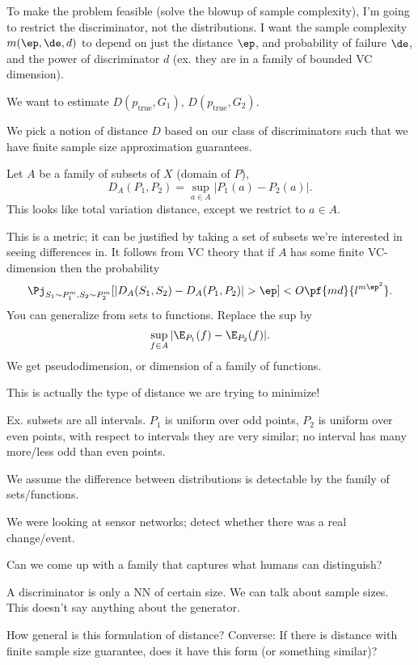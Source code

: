%
To make the problem feasible (solve the blowup of sample complexity), I'm going to restrict the discriminator, not the distributions.
I want the sample complexity $m(\ep,\de,d)$ to depend on just the distance $\ep$, and probability of failure $\de$, and the power of discriminator $d$ (ex. they are in a family of bounded VC dimension).

We want to estimate $D(p_{\text{true}}, G_1)$, $D(p_{\text{true}}, G_2)$. %

We pick a notion of distance $D$ based on our class of discriminators such that we have finite sample size approximation guarantees.

Let $A$ be a family of subsets of $X$ (domain of $P$), 
$$
D_A(P_1,P_2) = \sup_{a\in A}|P_1(a)-P_2(a)|.
$$
This looks like total variation distance, except we restrict to $a\in A$.

This is a metric; it can be justified by taking a set of subsets we're interested in seeing differences in. It follows from VC theory that if $A$ has some finite VC-dimension then the probability
$$
\Pj_{S_1\sim P_1^m,S_2\sim P_2^m}
[|D_A(S_1,S_2) - D_A(P_1,P_2)|>\ep]
<O\pf{md}{l^{m\ep^2}}.
$$
You can generalize from sets to functions. Replace the sup by 
$$
\sup_{f\in A} |\E_{P_1}(f) - \E_{P_2}(f)|.
$$
We get pseudodimension, or dimension of a family of functions.

This is actually the type of distance we are trying to minimize!

Ex. subsets are all intervals. $P_1$ is uniform over odd points, $P_2$ is uniform over even points, with respect to intervals they are very similar; no interval has many more/less odd than even points.

We assume the difference between distributions is detectable by the family of sets/functions.

We were looking at sensor networks; detect whether there was a real change/event.

Can we come up with a family that captures what humans can distinguish?


A discriminator is only a NN of certain size. We can talk about sample sizes. This doesn't say anything about the generator.

How general is this formulation of distance? Converse: If there is distance with finite sample size guarantee, does it have this form (or something similar)?


